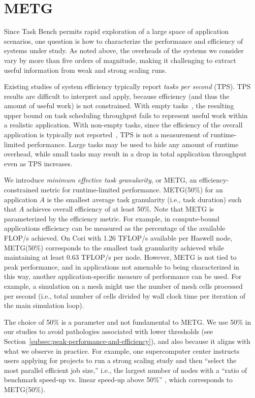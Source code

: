\section{METG}
\label{sec:metg}




Since Task Bench permits rapid exploration of a large space
of application scenarios, one question is how to characterize the
performance and efficiency of systems under study. As noted
above, the overheads of the systems we consider vary by more than
five orders of magnitude, making it challenging to extract useful
information from weak and strong scaling runs.

Existing studies of system efficiency
typically report \emph{tasks per second} (TPS). TPS results
are difficult to interpret and apply, because efficiency (and thus
the amount of useful work) is not constrained. With empty
tasks~\cite{LegionTracing18}, the resulting upper bound on task
scheduling throughput fails to represent useful work within a
realistic application. With non-empty tasks, since the efficiency of
the overall application is typically not reported~\cite{Canary16,
  Armstrong14}, TPS is not a measurement of runtime-limited
performance. Large tasks may be used to hide any amount of runtime
overhead, while small tasks may result in a drop in total application
throughput even as TPS increases.

We introduce \emph{minimum effective task granularity}, or METG, an
efficiency-constrained metric for runtime-limited
performance. METG(50\%) for an application $A$ is
the smallest average task granularity (i.e., task duration) such that $A$
achieves overall efficiency of at least 50\%. Note that METG is parameterized by the efficiency metric. For example, in
compute-bound applications efficiency can be measured as the
percentage of the available FLOP/s achieved. On Cori with 1.26 TFLOP/s available per Haswell node, METG(50\%) corresponds to
the smallest task granularity achieved while maintaining at least 0.63
TFLOP/s per node. However, METG is not tied to peak performance, and
in applications not amenable to being characterized in this way,
another application-specific measure of performance can be used. For
example, a simulation on a mesh might use the number of mesh cells
processed per second (i.e., total number of cells divided by wall
clock time per iteration of the main simulation loop).

The choice of 50\% is a parameter and not fundamental to METG. We use
50\% in our studies to avoid pathologies associated with lower
thresholds (see Section~\ref{subsec:peak-performance-and-efficiency}),
and also because it aligns with what we observe in practice. {\color{blue} For
example, one supercomputer center instructs users applying for
projects to run a strong scaling study and then ``select the most
parallel efficient job size,'' i.e., the largest number of nodes with
a ``ratio of benchmark speed-up vs. linear speed-up above 50\%''
\cite{CSCSReport}, which corresponds to METG(50\%).}

